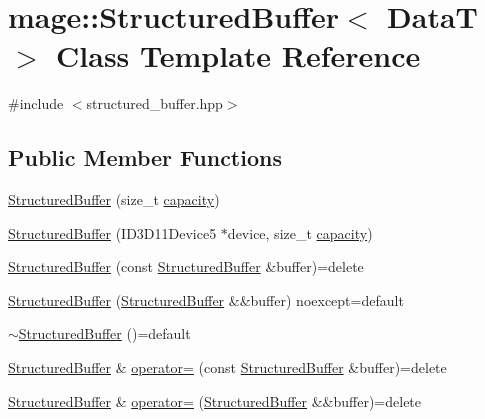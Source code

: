\hypertarget{classmage_1_1_structured_buffer}{}\section{mage\+:\+:Structured\+Buffer$<$ DataT $>$ Class Template Reference}
\label{classmage_1_1_structured_buffer}


{\ttfamily \#include $<$structured\+\_\+buffer.\+hpp$>$}

\subsection*{Public Member Functions}
\begin{DoxyCompactItemize}
\item 
\hyperlink{classmage_1_1_structured_buffer_aa958c00b00f43aa16244f7d61be90045}{Structured\+Buffer} (size\+\_\+t \hyperlink{classmage_1_1_structured_buffer_a4fe2940f733bccb2cd47227a44a93c2b}{capacity})
\item 
\hyperlink{classmage_1_1_structured_buffer_ae96205b7c3fc0eb8dadfa521b6eada61}{Structured\+Buffer} (I\+D3\+D11\+Device5 $\ast$device, size\+\_\+t \hyperlink{classmage_1_1_structured_buffer_a4fe2940f733bccb2cd47227a44a93c2b}{capacity})
\item 
\hyperlink{classmage_1_1_structured_buffer_aa017416099a12305d0177094c768150e}{Structured\+Buffer} (const \hyperlink{classmage_1_1_structured_buffer}{Structured\+Buffer} \&buffer)=delete
\item 
\hyperlink{classmage_1_1_structured_buffer_a9ecb838624ca5003cc3394adbe81bb3c}{Structured\+Buffer} (\hyperlink{classmage_1_1_structured_buffer}{Structured\+Buffer} \&\&buffer) noexcept=default
\item 
\hyperlink{classmage_1_1_structured_buffer_a02ab1d322e1aef0c608b85224b80dbcf}{$\sim$\+Structured\+Buffer} ()=default
\item 
\hyperlink{classmage_1_1_structured_buffer}{Structured\+Buffer} \& \hyperlink{classmage_1_1_structured_buffer_ac00255155ab1eb61244392adcf262d40}{operator=} (const \hyperlink{classmage_1_1_structured_buffer}{Structured\+Buffer} \&buffer)=delete
\item 
\hyperlink{classmage_1_1_structured_buffer}{Structured\+Buffer} \& \hyperlink{classmage_1_1_structured_buffer_a2647510e153d15b89f860e2a5c68e231}{operator=} (\hyperlink{classmage_1_1_structured_buffer}{Structured\+Buffer} \&\&buffer)=delete
\item 

\end{DoxyCompactItemize}
